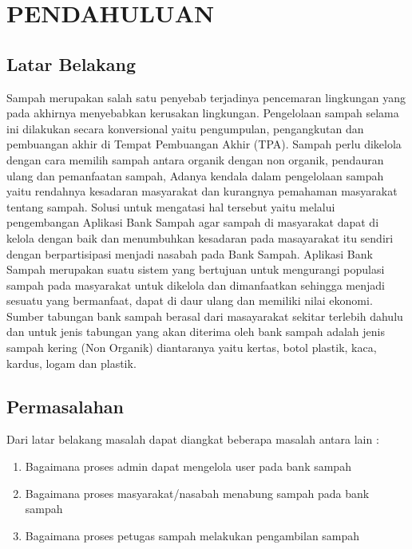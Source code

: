 \chapter{PENDAHULUAN}
\section{Latar Belakang}
\label{sec:latarbelakang} %

Sampah merupakan salah satu penyebab terjadinya pencemaran lingkungan yang pada akhirnya menyebabkan kerusakan lingkungan. Pengelolaan sampah selama ini dilakukan secara konversional yaitu pengumpulan, pengangkutan dan pembuangan akhir di Tempat Pembuangan Akhir (TPA). Sampah perlu dikelola dengan cara memilih sampah antara organik dengan non organik, pendauran ulang dan pemanfaatan sampah, Adanya kendala dalam pengelolaan sampah yaitu rendahnya kesadaran masyarakat dan kurangnya pemahaman masyarakat tentang sampah. Solusi untuk mengatasi hal tersebut yaitu melalui pengembangan Aplikasi Bank Sampah agar sampah di masyarakat dapat di kelola dengan baik dan menumbuhkan kesadaran pada masayarakat itu sendiri dengan berpartisipasi menjadi nasabah pada Bank Sampah.     
Aplikasi Bank Sampah merupakan suatu sistem yang bertujuan untuk mengurangi populasi sampah pada masyarakat untuk dikelola dan dimanfaatkan sehingga menjadi sesuatu yang bermanfaat, dapat di daur ulang dan memiliki nilai ekonomi. Sumber tabungan bank sampah berasal dari masayarakat sekitar terlebih dahulu dan untuk jenis tabungan yang akan diterima oleh bank sampah adalah jenis sampah kering (Non Organik) diantaranya yaitu kertas, botol plastik, kaca, kardus, logam dan plastik. 



\section{Permasalahan}
Dari latar belakang masalah dapat diangkat beberapa masalah antara lain :
\begin{enumerate}
\item Bagaimana proses admin dapat mengelola user pada bank sampah
\item Bagaimana proses masyarakat/nasabah menabung sampah pada bank sampah 
\item Bagaimana proses petugas sampah melakukan pengambilan sampah 
\end{enumerate}


